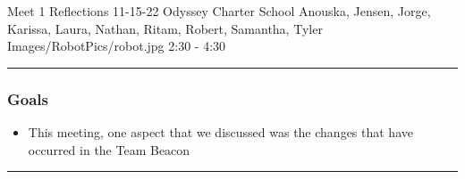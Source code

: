\insertmeeting 
	{Meet 1 Reflections} 
	{11-15-22} 
	{Odyssey Charter School}
	{Anouska, Jensen, Jorge, Karissa, Laura, Nathan, Ritam, Robert, Samantha, Tyler}
	{Images/RobotPics/robot.jpg}
	{2:30 - 4:30}
	
\noindent\hfil\rule{\textwidth}{.4pt}\hfil
\subsubsection*{Goals}
\begin{itemize}
    \item This meeting, one aspect that we discussed was the changes that have occurred in the Team Beacon 

\end{itemize} 

\noindent\hfil\rule{\textwidth}{.4pt}\hfil

